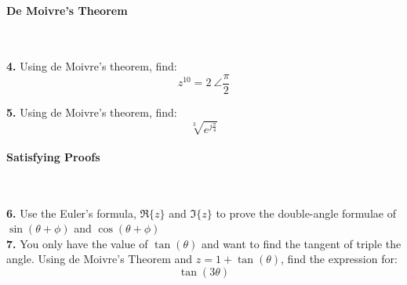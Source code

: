 \documentclass{article}
\begin{document}
\paragraph{De Moivre's Theorem} \

   \textbf{4.} Using de Moivre's theorem, find: $$z^{10} =  2 \ \angle{\frac{\pi}{2}}$$ 
 
  \textbf{5.} Using de Moivre's theorem, find: $$\sqrt[3]{e^{j\frac{\pi}{4}}} $$ 

\paragraph{Satisfying Proofs} \


  \textbf{6.} Use the Euler's formula, $\Re{\{ z \}}$ and $\Im{\{z\}}$ to prove the double-angle formulae of $\sin(\theta + \phi)$ and $\cos(\theta + \phi)$ \\

  \textbf{7.} You only have the value of $\tan(\theta)$ and want to find the tangent of triple the angle. Using de Moivre's Theorem and $z = 1 + \tan(\theta)$, find the expression for: $$\tan(3\theta) $$


  

  






\end{document}
